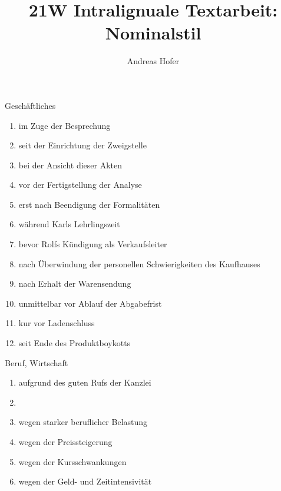 \documentclass{article}
\title{\vspace{-3cm}21W Intralignuale Textarbeit: Nominalstil}
\author{Andreas Hofer}
\begin{document}
	\maketitle
	Geschäftliches
	\begin{enumerate}
		\item{im Zuge der Besprechung}
		\item{seit der Einrichtung der Zweigstelle}
		\item{bei der Ansicht dieser Akten}
		\item{vor der Fertigstellung der Analyse}
		\item{erst nach Beendigung der Formalitäten}
		\item{während Karls Lehrlingszeit}
		\item{bevor Rolfs Kündigung als Verkaufsleiter}
		\item{nach Überwindung der personellen Schwierigkeiten des Kaufhauses}
		\item{nach Erhalt der Warensendung}
		\item{unmittelbar vor Ablauf der Abgabefrist}
		\item{kur vor Ladenschluss}
		\item{seit Ende des Produktboykotts}
	\end{enumerate}
	Beruf, Wirtschaft
	\begin{enumerate}
		\item{aufgrund des guten Rufs der Kanzlei}
		\item{}
		\item{wegen starker beruflicher Belastung}
		\item{wegen der Preissteigerung}
		\item{wegen der Kursschwankungen}
		\item{wegen der Geld- und Zeitintensivität}
	\end{enumerate}	
\end{document}
